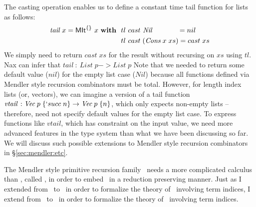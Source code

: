 The casting operation enables us to define a constant time tail function for
lists as follows:
\begin{align*}
\textit{tail}~x = \textsf{MIt}^{\{\}}~x~\textbf{with}~~
&  tl ~cast~\textit{Nil}~~~~~~~~~~~ = nil \\
&  tl ~cast\;(\textit{Cons}\;x\;xs) = cast\;xs
\end{align*}
We simply need to return $cast\;xs$ for the result
without recursing on $xs$ using $tl$. Nax can infer that
$\textit{tail} ~:~ \textit{List}\;p -> \textit{List}\;p$
Note that we needed to return some default value ($nil$) for the empty list case
($Nil$) because all functions defined via Mendler style recursion combinators
must be total. However, for length index lists (or, vectors), we can imagine
a version of a tail function
$\textit{vtail}\,:\textit{Vec}\;p\;\{`succ\;n\} -> \textit{Vec}\;p\;\{n\}$,
which only expects non-empty lists -- therefore, need not specify default
values for the empty list case. To express functions like $vtail$, which has
constraint on the input value, we need more advanced features in the type system
than what we have been discussing so far. We will discuss such possible
extensions to Mendler style recursion combinators in \S\ref{sec:mendler:etc}.

The Mendler style primitive recursion family \MPr\ needs a more complicated
calculus than \Fi, called \Fixw, in order to embed \MPr\ in a reduction
preserving manner. Just as I extended from \Fw\ to \Fi\ in order to
formalize the theory of \MIt\ involving term indices, I extend from \Fixw\
to \Fixi\ in order to formalize the theory of \MPr\ involving term indices.

